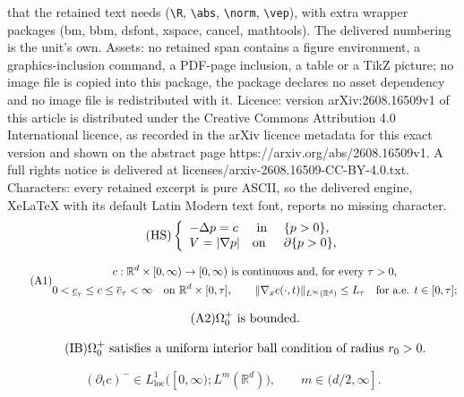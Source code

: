 \documentclass[10pt,a4paper]{amsart}
\def\R{\mathbb{R}}
\newcommand{\norm}[1]{\lVert #1 \rVert}
\begin{document}
that the retained text needs (\texttt{\textbackslash R}, \texttt{\textbackslash abs}, \texttt{\textbackslash norm}, \texttt{\textbackslash vep}), with extra wrapper packages (bm, bbm, dsfont, xspace, cancel, mathtools). The delivered numbering is the unit's own. Assets: no retained span contains a figure environment, a graphics-inclusion command, a PDF-page inclusion, a table or a TikZ picture; no image file is copied into this package, the package declares no asset dependency and no image file is redistributed with it. Licence: version arXiv:2608.16509v1 of this article is distributed under the Creative Commons Attribution 4.0 International licence, as recorded in the arXiv licence metadata for this exact version and shown on the abstract page https://arxiv.org/abs/2608.16509v1. A full rights notice is delivered at licenses/arxiv-2608.16509-CC-BY-4.0.txt. Characters: every retained excerpt is pure ASCII, so the delivered engine, XeLaTeX with its default Latin Modern text font, reports no missing character.
\begin{equation*}\tag{HS}\label{eq:intro-HS-law}
\left\{\begin{array}{lll}
    -\Delta p=c &\hbox{ in }&\{p>0\},\\
    V=|\nabla p| &\hbox{on }&\partial\{p>0\},
\end{array}\right.
\end{equation*}

\begin{equation*}\tag{A1}\label{eq:A-source}
\begin{gathered}
    c:\R^d\times[0,\infty)\to[0,\infty)\hbox{ is continuous and, for every }\tau>0,\\
    0<\underline c_\tau\leq c\leq\overline c_\tau<\infty
    \quad\hbox{on }\R^d\times[0,\tau],
    \qquad
    \norm{\nabla_xc(\cdot,t)}_{L^\infty(\R^d)}\leq L_\tau
    \quad\hbox{for a.e. }t\in[0,\tau];
\end{gathered}
\end{equation*}

\begin{equation*}\tag{A2}\label{eq:A-initial}
    \Omega_0^{+}\hbox{ is bounded.}
\end{equation*}

\begin{equation*}\tag{IB}\label{eq:A-interior-ball}
    \Omega_0^{+}\hbox{ satisfies a uniform interior ball condition of radius }r_0>0 .
\end{equation*}

\begin{equation*}\tag{S$_m$}\label{eq:A-source-time}
    (\partial_tc)^-\in L^1_{\operatorname{loc}}\bigl([0,\infty);L^m(\R^d)\bigr),
    \qquad m\in(d/2,\infty] .
\end{equation*}
\end{document}
